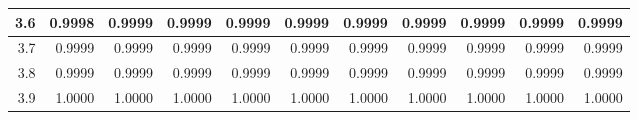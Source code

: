 \begin{center}
\begin{tabular}{|r|r@{\ }r@{\ }r@{\ }r@{\ }r@{\ }r@{\ }r@{\ }r@{\ }r@{\ }r@{\ }|}
    \hline
    3.6&0.9998&0.9999&0.9999&0.9999&0.9999&0.9999&0.9999&0.9999&0.9999&0.9999\\
    \hline
    3.7&0.9999&0.9999&0.9999&0.9999&0.9999&0.9999&0.9999&0.9999&0.9999&0.9999\\
    \hline
    3.8&0.9999&0.9999&0.9999&0.9999&0.9999&0.9999&0.9999&0.9999&0.9999&0.9999\\
    \hline
    3.9&1.0000&1.0000&1.0000&1.0000&1.0000&1.0000&1.0000&1.0000&1.0000&1.0000\\
    \hline
    \end{tabular}
\end{center}


